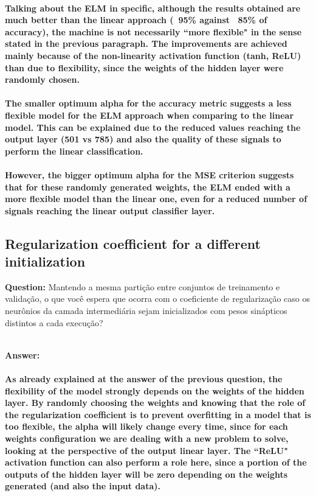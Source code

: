 \documentclass[a4paper]{article}    %
\begin{document}
\paragraph{Talking about the ELM in specific, although the results obtained are much better than the linear approach (~95\% against ~85\% of accuracy), the machine is not necessarily ``more flexible" in the sense stated in the previous paragraph. The improvements are achieved mainly because of the non-linearity activation function (tanh, ReLU) than due to flexibility, since the weights of the hidden layer were randomly chosen.}
%
\paragraph{The smaller optimum alpha for the accuracy metric suggests a less flexible model for the ELM approach when comparing to the linear model. This can be explained due to the reduced values reaching the output layer (501 vs 785) and also the quality of these signals to perform the linear classification.}
%
\paragraph{However, the bigger optimum alpha for the MSE criterion suggests that for these randomly generated weights, the ELM ended with a more flexible model than the linear one, even for a reduced number of signals reaching the linear output classifier layer.}

\newpage

\subsection{Regularization coefficient for a different initialization}

\textbf{Question:} \newline
Mantendo a mesma partição entre conjuntos de treinamento e validação, o que você espera que ocorra com o coeficiente de regularização caso os neurônios da camada intermediária sejam inicializados com pesos sinápticos distintos a cada execução? 

\textbf{\\Answer:}
\paragraph{As already explained at the answer of the previous question, the flexibility of the model strongly depends on the weights of the hidden layer. By randomly choosing the weights and knowing that the role of the regularization coefficient is to prevent overfitting in a model that is too flexible, the alpha will likely change every time, since for each weights configuration we are dealing with a new problem to solve, looking at the perspective of the output linear layer. The ``ReLU" activation function can also perform a role here, since a portion of the outputs of the hidden layer will be zero depending on the weights generated (and also the input data).}
%
\end{document}
